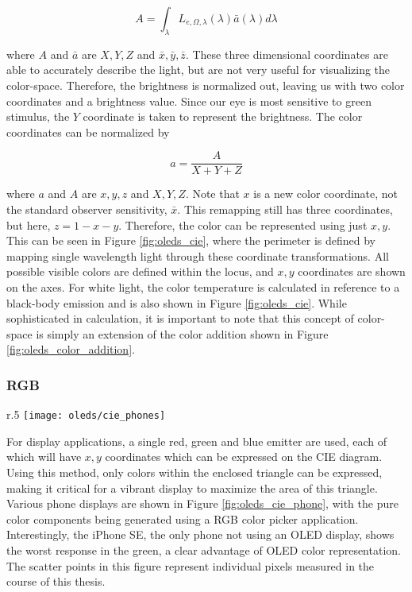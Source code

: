 \documentclass[../thesis.tex]{subfiles}
\begin{document}
\begin{equation}
A=\int_\lambda L_{e,\Omega,\lambda}(\lambda)\bar{a}(\lambda)d\lambda
\label{oleds_tristimulus}
\end{equation}

where $A$ and $\bar{a}$ are $X,Y,Z$ and $\bar{x},\bar{y},\bar{z}$.
These three dimensional coordinates are able to accurately describe the light, but are not very useful for visualizing the color-space.
Therefore, the brightness is normalized out, leaving us with two color coordinates and a brightness value.
Since our eye is most sensitive to green stimulus, the $Y$ coordinate is taken to represent the brightness.
The color coordinates can be normalized by

\begin{equation}
a=\frac{A}{X+Y+Z}
\label{oleds_color_coordinates}
\end{equation}

where $a$ and $A$ are $x,y,z$ and $X,Y,Z$.
Note that $x$ is a new color coordinate, not the standard observer sensitivity, $\bar{x}$.
This remapping still has three coordinates, but here, $z=1-x-y$.
Therefore, the color can be represented using just $x,y$.
This can be seen in Figure \ref{fig:oleds_cie}, where the perimeter is defined by mapping single wavelength light through these coordinate transformations.
All possible visible colors are defined within the locus, and $x,y$ coordinates are shown on the axes.
For white light, the color temperature is calculated in reference to a black-body emission and is also shown in Figure \ref{fig:oleds_cie}.
While sophisticated in calculation, it is important to note that this concept of color-space is simply an extension of the color addition shown in Figure \ref{fig:oleds_color_addition}.

\subsubsection{RGB}
\begin{wrapfigure}{r}{.5\textwidth}
\texttt{[image: oleds/cie\_phones]}
\caption{Various phone display limits shown on CIE coordinates}
\label{fig:oleds_cie_phone}
\end{wrapfigure}

For display applications, a single red, green and blue emitter are used, each of which will have $x,y$ coordinates which can be expressed on the CIE diagram.
Using this method, only colors within the enclosed triangle can be expressed, making it critical for a vibrant display to maximize the area of this triangle.
Various phone displays are shown in Figure \ref{fig:oleds_cie_phone}, with the pure color components being generated using a RGB color picker application.
Interestingly, the iPhone SE, the only phone not using an OLED display, shows the worst response in the green, a clear advantage of OLED color representation.
The scatter points in this figure represent individual pixels measured in the course of this thesis.
\end{document}
